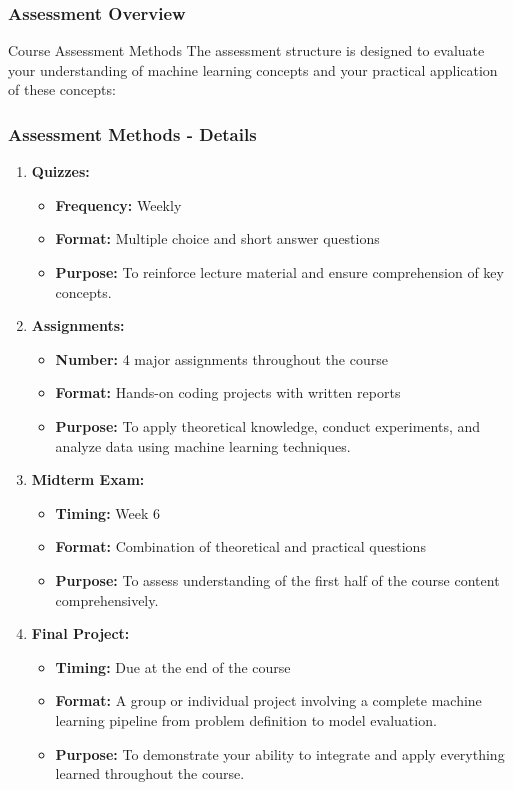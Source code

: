 \documentclass[aspectratio=169]{beamer}
\begin{document}
\begin{frame}[fragile]
    \frametitle{Assessment Overview}
    \begin{block}{Course Assessment Methods}
        The assessment structure is designed to evaluate your understanding of machine learning concepts and your practical application of these concepts:
    \end{block}
\end{frame}

\begin{frame}[fragile]
    \frametitle{Assessment Methods - Details}
    \begin{enumerate}
        \item \textbf{Quizzes:}
        \begin{itemize}
            \item \textbf{Frequency:} Weekly
            \item \textbf{Format:} Multiple choice and short answer questions
            \item \textbf{Purpose:} To reinforce lecture material and ensure comprehension of key concepts.
        \end{itemize}

        \item \textbf{Assignments:}
        \begin{itemize}
            \item \textbf{Number:} 4 major assignments throughout the course
            \item \textbf{Format:} Hands-on coding projects with written reports
            \item \textbf{Purpose:} To apply theoretical knowledge, conduct experiments, and analyze data using machine learning techniques.
        \end{itemize}

        \item \textbf{Midterm Exam:}
        \begin{itemize}
            \item \textbf{Timing:} Week 6
            \item \textbf{Format:} Combination of theoretical and practical questions
            \item \textbf{Purpose:} To assess understanding of the first half of the course content comprehensively.
        \end{itemize}

        \item \textbf{Final Project:}
        \begin{itemize}
            \item \textbf{Timing:} Due at the end of the course
            \item \textbf{Format:} A group or individual project involving a complete machine learning pipeline from problem definition to model evaluation.
            \item \textbf{Purpose:} To demonstrate your ability to integrate and apply everything learned throughout the course.
        \end{itemize}
    \end{enumerate}
\end{frame}
\end{document}

